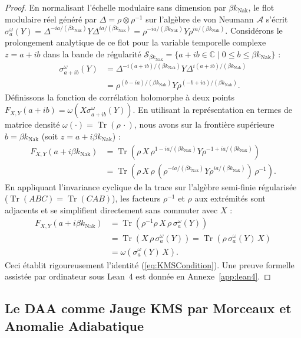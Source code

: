 \documentclass[10pt,twocolumn,a4paper]{article}
\theoremstyle{plain}
\theoremstyle{definition}
\theoremstyle{remark}
\newcommand{\kNak}{k_{\text{Nak}}}
\newcommand{\Tr}{\operatorname{Tr}}
\begin{document}
\begin{proof}
En normalisant l'échelle modulaire sans dimension par $\beta\kNak$, le flot modulaire réel généré par $\Delta = \rho \otimes \rho^{-1}$ sur l'algèbre de von Neumann $\mathcal{A}$ s'écrit $\sigma_a^\omega(Y) = \Delta^{-ia/(\beta\kNak)} Y \Delta^{ia/(\beta\kNak)} = \rho^{-ia/(\beta\kNak)} Y \rho^{ia/(\beta\kNak)}$. Considérons le prolongement analytique de ce flot pour la variable temporelle complexe $z = a + ib$ dans la bande de régularité $\mathcal{S}_{\beta\kNak} = \{ a + ib \in \mathbb{C} \mid 0 \le b \le \beta\kNak \}$ :
\begin{align}
    \sigma_{a + ib}^\omega(Y) &= \Delta^{-i(a + ib)/(\beta\kNak)} Y \Delta^{i(a + ib)/(\beta\kNak)} \nonumber \\
    &= \rho^{(b - ia)/(\beta\kNak)} Y \rho^{(-b + ia)/(\beta\kNak)}.
    \label{eq:AnalyticFlow}
\end{align}
Définissons la fonction de corrélation holomorphe à deux points $F_{X,Y}(a + ib) = \omega(X \sigma_{a + ib}^\omega(Y))$. En utilisant la représentation en termes de matrice densité $\omega(\cdot) = \Tr(\rho \, \cdot)$, nous avons sur la frontière supérieure $b = \beta\kNak$ (soit $z = a + i\beta\kNak$) :
\begin{align}
    F_{X,Y}(a + i\beta\kNak) &= \Tr\left( \rho \, X \, \rho^{1 - ia/(\beta\kNak)} Y \rho^{-1 + ia/(\beta\kNak)} \right) \nonumber \\
    &= \Tr\left( \rho \, X \, \rho \, (\rho^{-ia/(\beta\kNak)} Y \rho^{ia/(\beta\kNak)}) \, \rho^{-1} \right).
\end{align}
En appliquant l'invariance cyclique de la trace sur l'algèbre semi-finie régularisée ($\Tr(ABC) = \Tr(CAB)$), les facteurs $\rho^{-1}$ et $\rho$ aux extrémités sont adjacents et se simplifient directement sans commuter avec $X$ :
\begin{align}
    F_{X,Y}(a + i\beta\kNak) &= \Tr\left( \rho^{-1} \rho \, X \, \rho \, \sigma_a^\omega(Y) \right) \nonumber \\
    &= \Tr\left( X \, \rho \, \sigma_a^\omega(Y) \right) = \Tr\left( \rho \, \sigma_a^\omega(Y) \, X \right) \nonumber \\
    &= \omega\left( \sigma_a^\omega(Y) \, X \right).
\end{align}
Ceci établit rigoureusement l'identité (\ref{eq:KMSCondition}). Une preuve formelle assistée par ordinateur sous Lean~4 est donnée en Annexe~\ref{app:lean4}.
\end{proof}

\subsection{Le DAA comme Jauge KMS par Morceaux et Anomalie Adiabatique}
\label{subsec:piecewise_kms}
\end{document}
